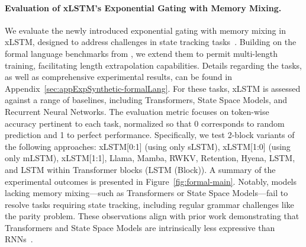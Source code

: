 \paragraph{Evaluation of xLSTM's Exponential Gating with Memory Mixing.} We evaluate the newly introduced exponential gating with memory mixing in xLSTM, designed to address challenges in state tracking tasks~\citep{Merrill:24, Merrill:23}. Building on the formal language benchmarks from \citet{Deletang:23}, we extend them to permit multi-length training, facilitating length extrapolation capabilities. Details regarding the tasks, as well as comprehensive experimental results, can be found in Appendix~\ref{sec:appExpSynthetic-formalLang}. For these tasks, xLSTM is assessed against a range of baselines, including Transformers, State Space Models, and Recurrent Neural Networks. The evaluation metric focuses on token-wise accuracy pertinent to each task, normalized so that 0 corresponds to random prediction and 1 to perfect performance. Specifically, we test 2-block variants of the following approaches: xLSTM[0:1] (using only sLSTM), xLSTM[1:0] (using only mLSTM), xLSTM[1:1], Llama, Mamba, RWKV, Retention, Hyena, LSTM, and LSTM within Transformer blocks (LSTM (Block)). A summary of the experimental outcomes is presented in Figure~\ref{fig:formal-main}. Notably, models lacking memory mixing—such as Transformers or State Space Models—fail to resolve tasks requiring state tracking, including regular grammar challenges like the parity problem. These observations align with prior work demonstrating that Transformers and State Space Models are intrinsically less expressive than RNNs~\citep{Merrill:24, Merrill:23, Deletang:23}.

